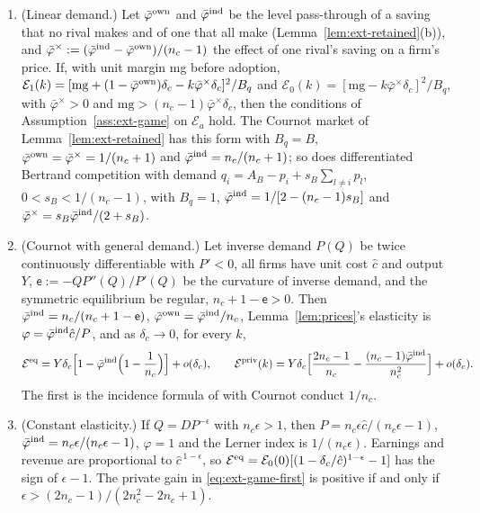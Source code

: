 \begin{lemma}\label{lem:ext-game-pass}
\begin{enumerate}
\item[(a)] (Linear demand.) Let $\bar\varphi^{\rm own}$ and $\bar\varphi^{\rm ind}$ be the level pass-through of a saving that no rival makes and of one that all make (Lemma~\ref{lem:ext-retained}(b)), and $\bar\varphi^\times:=(\bar\varphi^{\rm ind}-\bar\varphi^{\rm own})/(n_c-1)$ the effect of one rival's saving on a firm's price. If, with unit margin mg before adoption, $\mathcal E_1(k)=[\mathrm{mg}+(1-\bar\varphi^{\rm own})\delta_c-k\bar\varphi^\times\delta_c]^2/B_q$ and $\mathcal E_0(k)=[\mathrm{mg}-k\bar\varphi^\times\delta_c]^2/B_q$, with $\bar\varphi^\times>0$ and $\mathrm{mg}>(n_c-1)\bar\varphi^\times\delta_c$, then the conditions of Assumption~\ref{ass:ext-game} on $\mathcal E_a$ hold. The Cournot market of Lemma~\ref{lem:ext-retained} has this form with $B_q=B$, $\bar\varphi^{\rm own}=\bar\varphi^\times=1/(n_c+1)$ and $\bar\varphi^{\rm ind}=n_c/(n_c+1)$; so does differentiated Bertrand competition with demand $q_i=A_B-p_i+s_B\sum_{l\ne i}p_l$, $0<s_B<1/(n_c-1)$, with $B_q=1$, $\bar\varphi^{\rm ind}=1/[2-(n_c-1)s_B]$ and $\bar\varphi^\times=s_B\bar\varphi^{\rm ind}/(2+s_B)$.
\item[(b)] (Cournot with general demand.) Let inverse demand $P(Q)$ be twice continuously differentiable with $P'<0$, all firms have unit cost $\hat c$ and output $Y$, $\mathsf e:=-QP''(Q)/P'(Q)$ be the curvature of inverse demand, and the symmetric equilibrium be regular, $n_c+1-\mathsf e>0$. Then $\bar\varphi^{\rm ind}=n_c/(n_c+1-\mathsf e)$, $\bar\varphi^{\rm own}=\bar\varphi^{\rm ind}/n_c$, Lemma~\ref{lem:prices}'s elasticity is $\varphi=\bar\varphi^{\rm ind}\hat c/P$, and as $\delta_c\to0$, for every $k$,
\begin{equation}\label{eq:ext-game-first}
\mathcal E^{\rm eq}=Y\delta_c\Bigl[1-\bar\varphi^{\rm ind}\Bigl(1-\frac1{n_c}\Bigr)\Bigr]+o(\delta_c),\qquad \mathcal E^{\rm priv}(k)=Y\delta_c\Bigl[\frac{2n_c-1}{n_c}-\frac{(n_c-1)\bar\varphi^{\rm ind}}{n_c^2}\Bigr]+o(\delta_c).
\end{equation}
The first is the incidence formula of \citet{weyl2013pass} with Cournot conduct $1/n_c$.
\item[(c)] (Constant elasticity.) If $Q=DP^{-\epsilon}$ with $n_c\epsilon>1$, then $P=n_c\epsilon\hat c/(n_c\epsilon-1)$, $\bar\varphi^{\rm ind}=n_c\epsilon/(n_c\epsilon-1)$, $\varphi=1$ and the Lerner index is $1/(n_c\epsilon)$. Earnings and revenue are proportional to $\hat c^{\,1-\epsilon}$, so $\mathcal E^{\rm eq}=\mathcal E_0(0)[(1-\delta_c/\hat c)^{1-\epsilon}-1]$ has the sign of $\epsilon-1$. The private gain in \eqref{eq:ext-game-first} is positive if and only if $\epsilon>(2n_c-1)/(2n_c^2-2n_c+1)$.
\end{enumerate}
\end{lemma}

